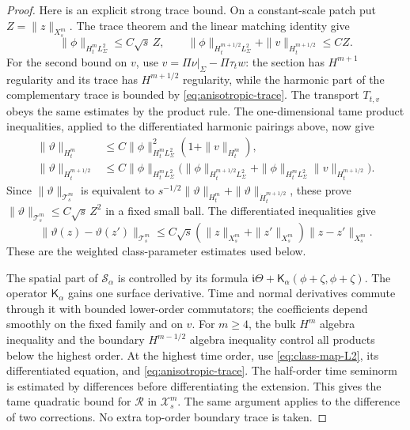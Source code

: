 \documentclass[11pt]{amsart}
\theoremstyle{definition}
\theoremstyle{remark}
\theoremstyle{plain}
\numberwithin{equation}{section}
\begin{document}
\begin{proof}
Here is an explicit strong trace bound. On a constant-scale patch
put $Z=\|z\|_{X_s^m}$. The trace theorem and the linear matching
identity give
\[
\|\phi\|_{H^m_tL^2_\Sigma}\le C\sqrt{s}\,Z,\qquad
\|\phi\|_{H^{m+1/2}_tL^2_\Sigma}
 +\|v\|_{H^{m+1/2}_t}\le CZ.
\]
For the second bound on $v$, use
$v=\Pi\nu|_\Sigma-\Pi\tau_tw$: the section has $H^{m+1}$
regularity and its trace has $H^{m+1/2}$ regularity, while the
harmonic part of the complementary trace is bounded by
\eqref{eq:anisotropic-trace}. The transport $T_{t,v}$ obeys the
same estimates by the product rule. The one-dimensional tame
product inequalities, applied to the differentiated harmonic
pairings above, now give
\begin{align*}
\|\vartheta\|_{H^m_t}&\le C\|\phi\|_{H^m_tL^2_\Sigma}^2
 (1+\|v\|_{H^m_t}),\\
\|\vartheta\|_{H^{m+1/2}_t}&\le
 C\|\phi\|_{H^m_tL^2_\Sigma}
 \bigl(\|\phi\|_{H^{m+1/2}_tL^2_\Sigma}
       +\|\phi\|_{H^m_tL^2_\Sigma}\|v\|_{H^{m+1/2}_t}\bigr).
\end{align*}
Since $\|\vartheta\|_{\mathcal T_s^m}$ is equivalent to
$s^{-1/2}\|\vartheta\|_{H^m_t}+\|\vartheta\|_{\dot H^{m+1/2}_t}$,
these prove $\|\vartheta\|_{\mathcal T_s^m}\le C\sqrt{s}\,Z^2$
in a fixed small ball. The differentiated inequalities give
\[
\|\vartheta(z)-\vartheta(z')\|_{\mathcal T_s^m}
 \le C\sqrt{s}(\|z\|_{X_s^m}+\|z'\|_{X_s^m})
                  \|z-z'\|_{X_s^m}.
\]
These are the weighted class-parameter estimates used below.

The spatial part of $\mathcal S_\alpha$ is controlled by its
formula $\mathfrak i\Theta+\mathsf K_\alpha(\phi+\zeta,\phi+\zeta)$.
The operator $\mathsf K_\alpha$ gains one surface derivative.
Time and normal derivatives commute through it with bounded
lower-order commutators; the coefficients depend smoothly on the
fixed family and on $v$. For $m\ge4$, the bulk $H^m$ algebra
inequality and the boundary $H^{m-1/2}$ algebra inequality control
all products below the highest order. At the highest time order,
use \eqref{eq:class-map-L2}, its differentiated equation, and
\eqref{eq:anisotropic-trace}. The half-order time seminorm is
estimated by differences before differentiating the extension.
This gives the tame quadratic bound for $\mathcal R$ in
$\mathcal X_s^m$. The same argument applies to the difference of
two corrections. No extra top-order boundary trace is taken.


\end{proof}
\end{document}
